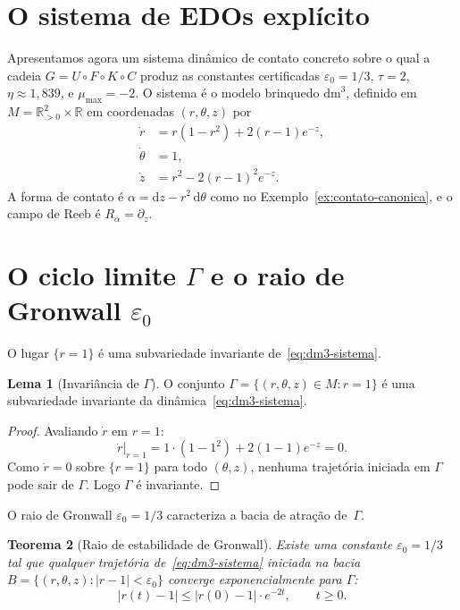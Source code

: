 \documentclass[12pt,a4paper,twoside]{book}
\theoremstyle{plain}
\newtheorem{teorema}{Teorema}[section]
\theoremstyle{definition}
\newtheorem{lema}[teorema]{Lema}
\theoremstyle{definition}
\newcommand{\R}{\mathbb{R}}
\newcommand{\epsz}{\varepsilon_{0}}
\newcommand{\tribo}{\eta}
\newcommand{\Reeb}{R_\alpha}
\newcommand{\dd}{\mathrm{d}}
\newcommand{\dm}{\mathrm{dm}^{3}}
\begin{document}
\section{O sistema de EDOs explícito}
\label{sec:dm3-din}

Apresentamos agora um sistema dinâmico de contato concreto sobre o qual
a cadeia $G = U \circ F \circ K \circ C$ produz as constantes certificadas
$\epsz = 1/3$, $\tau = 2$, $\tribo \approx 1{,}839$, e $\mu_{\max} = -2$.
O sistema é o modelo brinquedo $\dm$, definido em
$M = \R^{2}_{>0} \times \R$ em coordenadas $(r,\theta,z)$ por
\begin{equation}\label{eq:dm3-sistema}
  \begin{aligned}
    \dot r &= r(1 - r^{2}) + 2(r-1)e^{-z}, \\
    \dot\theta &= 1, \\
    \dot z &= r^{2} - 2(r-1)^{2}e^{-z}.
  \end{aligned}
\end{equation}
A forma de contato é $\alpha = \dd z - r^{2}\,\dd\theta$ como no
Exemplo~\ref{ex:contato-canonica}, e o campo de Reeb é $\Reeb = \partial_{z}$.

\section{O ciclo limite $\Gamma$ e o raio de Gronwall $\epsz$}

O lugar $\{r=1\}$ é uma subvariedade invariante de~\eqref{eq:dm3-sistema}.

\begin{lema}[Invariância de $\Gamma$]\label{lem:gamma-invar}
O conjunto $\Gamma = \{(r,\theta,z) \in M : r = 1\}$ é uma subvariedade
invariante da dinâmica~\eqref{eq:dm3-sistema}.
\end{lema}

\begin{proof}
Avaliando $\dot r$ em $r = 1$:
\[
  \dot r\big|_{r=1} = 1 \cdot (1 - 1^{2}) + 2(1-1)e^{-z} = 0.
\]
Como $\dot r = 0$ sobre $\{r=1\}$ para todo $(\theta, z)$, nenhuma trajetória
iniciada em $\Gamma$ pode sair de $\Gamma$. Logo $\Gamma$ é invariante.
\end{proof}

O raio de Gronwall $\epsz = 1/3$ caracteriza a bacia de atração de~$\Gamma$.

\begin{teorema}[Raio de estabilidade de Gronwall]\label{thm:gronwall}
Existe uma constante $\epsz = 1/3$ tal que qualquer trajetória
de~\eqref{eq:dm3-sistema} iniciada na bacia
$B = \{(r,\theta,z) : |r-1| < \epsz\}$ converge exponencialmente para
$\Gamma$:
\[
  |r(t) - 1| \le |r(0) - 1| \cdot e^{-2t}, \qquad t \ge 0.
\]
\end{teorema}
\end{document}
